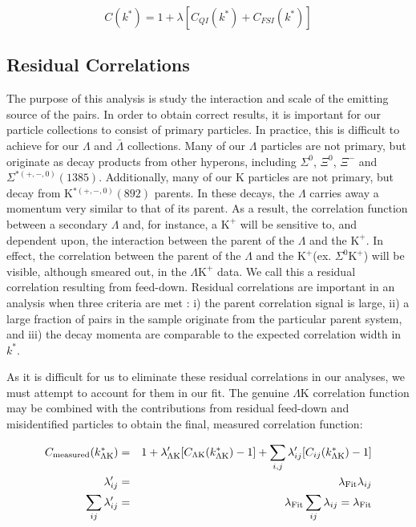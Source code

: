\documentclass[ALICE,manyauthors]{cernphprep}
\newcommand{\kstar}{$k^{*}$\xspace}
\newcommand{\Lam}{$\Lambda$\xspace}
\newcommand{\ALam}{$\bar{\Lambda}$\xspace}
\newcommand{\KchP}{$\mathrm{K^{+}}$\xspace}
\newcommand{\LamK}{$\Lambda$K\xspace}
\newcommand{\LamKchP}{$\Lambda\mathrm{K^{+}}$\xspace}
\begin{document}
\begin{equation}
 C(k^{*}) = 1 + \lambda[C_{QI}(k^{*}) + C_{FSI}(k^{*})]
\label{eqn:LednickyEqnwLambda}
\end{equation}


\subsection{Residual Correlations}
\label{ResidualCorrelations}

The purpose of this analysis is study the interaction and scale of the emitting source of the pairs.
In order to obtain correct results, it is important for our particle collections to consist of primary particles.
In practice, this is difficult to achieve for our \Lam and \ALam collections.
Many of our \Lam particles are not primary, but originate as decay products from other hyperons, including $\Sigma^{0}$, $\Xi^{0}$, $\Xi^{-}$ and $\Sigma^{*(+,-,0)}(1385)$.  
Additionally, many of our K particles are not primary, but decay from K$^{*(+,-,0)}(892)$ parents.
In these decays, the \Lam carries away a momentum very similar to that of its parent.
As a result, the correlation function between a secondary \Lam and, for instance, a \KchP  will be sensitive to, and dependent upon, the interaction between the parent of the \Lam and the \KchP.
In effect, the correlation between the parent of the \Lam and the \KchP (ex. $\Sigma^{0}$\KchP) will be visible, although smeared out, in the \LamKchP data.
We call this a residual correlation resulting from feed-down.  
Residual correlations are important in an analysis when three criteria are met \cite{Kisiel:2014mma}: i) the parent correlation signal is large, ii) a large fraction of pairs in the sample originate from the particular parent system, and iii) the decay momenta are comparable to the expected correlation width in \kstar. 

As it is difficult for us to eliminate these residual correlations in our analyses, we must attempt to account for them in our fit.
The genuine \LamK correlation function may be combined with the contributions from residual feed-down and misidentified particles to obtain the final, measured correlation function:


\begin{eqnarray}
\label{eqn:Residuals} 
 C_{\mathrm{measured}}(k^{*}_{\Lambda\mathrm{K}}) &=& 1 + \lambda'_{\Lambda\mathrm{K}}[C_{\Lambda\mathrm{K}}(k^{*}_{\Lambda\mathrm{K}}) - 1] + \sum\limits_{i,j}  \lambda'_{ij}[C_{ij}(k^{*}_{\Lambda\mathrm{K}})-1] \\
 \lambda_{ij}' &=& \lambda_{\mathrm{Fit}}\lambda_{ij} \notag \\
 \sum\limits_{ij}\lambda_{ij}' &=&  \lambda_{\mathrm{Fit}}\sum\limits_{ij}\lambda_{ij} = \lambda_{\mathrm{Fit}} \notag
\end{eqnarray}
\end{document}
